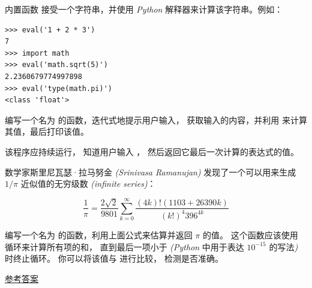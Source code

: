 \begin{exercise}
  


内置函数 {\em {}} 接受一个字符串，并使用 {\em Python} 解释器来计算该字符串。例如：

\begin{em}
\begin{lstlisting}
>>> eval('1 + 2 * 3')
7
>>> import math
>>> eval('math.sqrt(5)')
2.2360679774997898
>>> eval('type(math.pi)')
<class 'float'>
\end{lstlisting}
\end{em}

%

编写一个名为 {\em {}} 的函数，迭代式地提示用户输入， 获取输入的内容，并利用 {\em {}} 来计算其值，最后打印该值。


该程序应持续运行， 知道用户输入 {\em {}}， 然后返回它最后一次计算的表达式的值。

\end{exercise}


\begin{exercise}


数学家斯里尼瓦瑟·拉马努金 {\em (Srinivasa Ramanujan)} 发现了一个可以用来生成 $1 / \pi$
近似值的无穷级数 {\em (infinite series)}：

\[ \frac{1}{\pi} = \frac{2\sqrt{2}}{9801}
\sum^\infty_{k=0} \frac{(4k)!(1103+26390k)}{(k!)^4 396^{4k}} \]


编写一个名为 {\em {}} 的函数，利用上面公式来估算并返回 $\pi$
的值。 这个函数应该使用 {\em {}} 循环来计算所有项的和， 直到最后一项小于 {\em {}} {\em (Python} 中用于表达 $10^{-15}$ 的写法{\em )} 时终止循环。 你可以将该值与 {\em {}} 进行比较， 检测是否准确。


\href{http://thinkpython2.com/code/pi.py}{参考答案}

\end{exercise}
